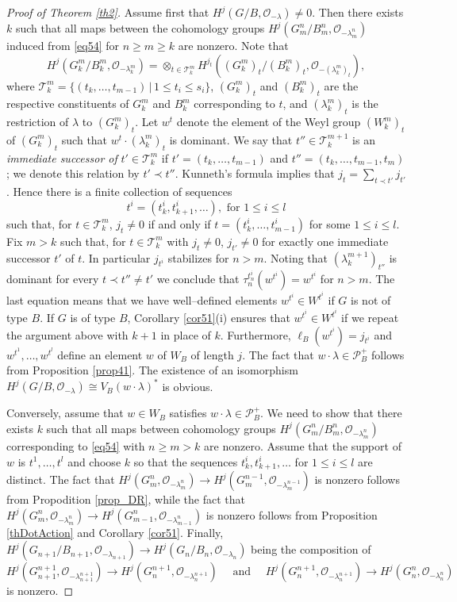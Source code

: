\documentclass[12pt]{amsart}
\def\cO{\mathcal{O}}
\def\cP{\mathcal{P}}
\def\cT{\mathcal{T}}
\theoremstyle{remark}
\begin{document}
\begin{proof}[Proof of Theorem \ref{th2}]
Assume first that $H^j(G/B, \cO_{-\lambda}) \neq 0$. Then there exists $k$ such that all 
maps between the cohomology groups $H^j(G_m^n/B_m^n, \cO_{-\lambda_m^n})$ induced from \eqref{eq54} for $n \geq m \geq k$ are
nonzero. Note that
$$
H^j (G_k^m/B_k^m, \cO_{-\lambda_k^m}) = \otimes_{t \in \cT_k^m} H^{j_t}((G_k^m)_t/(B_k^m)_t, \cO_{-(\lambda_k^m)_t}),
$$
where $\cT_k^m = \{(t_k, \ldots, t_{m-1}) \, | \, 1 \leq t_i \leq s_i\}$, $(G_k^m)_t$ and $(B_k^m)_t$ are the respective 
constituents of $G_k^m$ and $B_k^m$ corresponding to $t$, and $(\lambda_k^m)_t$ is the restriction of $\lambda$ to $(G_k^m)_t$. 
Let $w^t$ denote the element of the Weyl group  $(W_k^m)_t$ of $(G_k^m)_t$ such that $w^t \cdot (\lambda_k^m)_t$ is dominant.
We say that $t'' \in \cT_k^{m+1}$ is an {\it immediate successor of} $t' \in \cT_k^m$  if
$t' = (t_k, \ldots, t_{m-1})$ and $t'' = (t_k, \ldots, t_{m-1}, t_m)$; we denote this relation by $t' \prec t''$.
Kunneth's formula implies that $j_t = \sum_{t \prec t'} j_{t'}$. Hence there is a finite collection of sequences 
$$
t^i = (t_k^i, t_{k+1}^i, \ldots), {\text { for }} 1 \leq i \leq l
$$
such that, for $t \in \cT_k^m$,  $j_t \neq 0$ if and only if $t = (t_k^i, \ldots, t_{m-1}^i)$ for some $1 \leq i \leq l$.
Fix $m>k$ such that, for $t \in \cT_k^m$ with $j_t \neq 0$, $j_{t'} \neq 0$ for exactly one immediate successor $t'$ of $t$.
In particular $j_{t^i}$ stabilizes for $n >m$.
Noting that $(\lambda_k^{m+1})_{t''}$ is dominant for every $t \prec t'' \neq t'$ we conclude that $\tau_n^{t^i_{n}}(w^{t^i}) = w^{t^i}$
for $n > m$. The last equation means that we have well--defined elements $w^{t^i} \in W^{t^i}$ if $G$ is not of type $B$. 
If $G$ is of type $B$, Corollary \ref{cor51}(i) ensures that $w^{t^i} \in W^{t^i}$ if we repeat the argument above with $k+1$ in place 
of $k$.
Furthermore,
$\ell_B(w^{t^i}) = j_{t^i}$ and $w^{t^1}, \ldots, w^{t^l}$ define an element $w$ of $W_B$ of length $j$. 
The fact that 
$w \cdot \lambda \in \cP_B^+$ follows from Proposition \ref{prop41}. The existence of an isomorphism
$H^j(G/B, \cO_{-\lambda}) \cong  V_B(w \cdot \lambda)^*$ is obvious.

Conversely, assume that $w \in W_B$ satisfies $w \cdot \lambda \in \cP_B^+$. We need to show that there exists $k$ such that
all maps  
between cohomology groups $H^j(G_m^n/B_m^n, \cO_{-\lambda_m^n})$ corresponding to \eqref{eq54} 
with $n \geq m > k$ are nonzero. Assume that the support of $w$ is $t^1, \ldots, t^l$ and choose $k$
so that the sequences $t_k^i, t_{k+1}^i, \ldots$ for $1 \leq i \leq l$ are distinct. The fact  that 
$H^j(G_m^n, \cO_{-\lambda_m^n}) \to H^j(G_m^{n-1}, \cO_{-\lambda_m^{n-1}})$ is nonzero follows from
Propodition \ref{prop_DR}, while the fact that 
$H^j(G_m^n, \cO_{-\lambda_m^n}) \to H^j(G_{m-1}^{n}, \cO_{-\lambda_{m-1}^{n}})$ is nonzero follows 
from Proposition \ref{thDotAction} and Corollary \ref{cor51}. 
Finally, $H^j(G_{n+1}/B_{n+1}, \cO_{-\lambda_{n+1}}) \to H^j(G_{n}/B_{n}, \cO_{-\lambda_{n}})$
being the composition of 
$$
H^j(G_{n+1}^{n+1}, \cO_{-\lambda_{n+1}^{n+1}}) \to H^j(G_{n}^{n+1}, \cO_{-\lambda_{n}^{n+1}}) \quad {\text { and }} \quad
H^j(G_{n}^{n+1}, \cO_{-\lambda_{n}^{n+1}}) \to H^j(G_{n}^{n}, \cO_{-\lambda_{n}^{n}})
$$ 
is  nonzero.
\end{proof}
\end{document}
